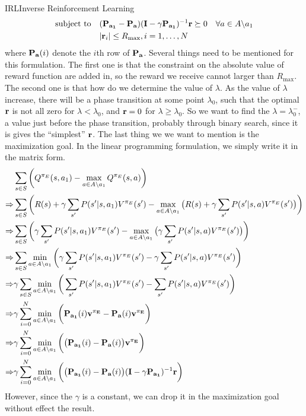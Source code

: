 \documentclass[9pt]{article}
\begin{document}
\begin{topic}{IRL}{Inverse Reinforcement Learning}
\[\begin{split}
\text{subject to} & \quad (\mathbf{P_{a_1}} - \mathbf{P_{a}})(\mathbf{I} - \gamma\mathbf{P_{a_1}})^{-1}\mathbf{r}  \succeq 0 \quad \forall a \in A \backslash a_1\\
& \quad |\mathbf{r}_i| \le R_{\text{max}}, i = 1, \ldots, N
\end{split}
\]
where $\mathbf{P_{a}}(i)$ denote the $i$th row of $\mathbf{P_{a}}$. Several things need to be mentioned for this formulation. The first one is that  the constraint on the absolute value of reward function are added in, so the reward we receive cannot larger than $R_{\text{max}}$. The second one is that how do we determine the value of $\lambda$. As the value of $\lambda$ increase, there will be a phase transition at some point $\lambda_0$, such that the optimal $\mathbf{r}$ is not all zero for $\lambda < \lambda_0$, and $\mathbf{r} = 0$ for $\lambda \ge \lambda_0$. So we want to find the $\lambda = \lambda_0^{-}$, a value just before the phase transition, probably through binary search, since it is gives the ``simplest'' $\mathbf{r}$. The last thing we we want to mention is the maximization goal. In the linear programming formulation, we simply write it in the matrix form.
\[
\begin{split}
	& \sum_{s\in S} \bigg(Q^{\pi_E}(s, a_1) - \max_{a\in A\backslash a_1}Q^{\pi_E}(s,a)\bigg)\\
\Rightarrow & \sum_{s\in S} \bigg(R(s) + \gamma \sum_{s'}P(s'|s,a_1)V^{\pi_E}(s') - \max_{a\in A\backslash a_1} \big(R(s) + \gamma \sum_{s'}P(s'|s,a)V^{\pi_E}(s')\big)\bigg)\\
\Rightarrow & \sum_{s\in S} \bigg(\gamma \sum_{s'}P(s'|s,a_1)V^{\pi_E}(s') - \max_{a\in A\backslash a_1} \big(\gamma \sum_{s'}P(s'|s,a)V^{\pi_E}(s')\big)\bigg)\\
\Rightarrow & \sum_{s\in S} \min_{a\in A\backslash a_1} \bigg(\gamma \sum_{s'}P(s'|s,a_1)V^{\pi_E}(s') -  \gamma \sum_{s'}P(s'|s,a)V^{\pi_E}(s')\bigg)\\ 
\Rightarrow & \gamma \sum_{s\in S} \min_{a\in A\backslash a_1} \bigg(\sum_{s'}P(s'|s,a_1)V^{\pi_E}(s') -  \sum_{s'}P(s'|s,a)V^{\pi_E}(s')\bigg)\\ 
\Rightarrow & \gamma \sum_{i=0}^{N} \min_{a\in A\backslash a_1} \bigg(\mathbf{P_{a_1}}(i)  \mathbf{v^{\pi_E}} -  \mathbf{P_a}(i)  \mathbf{v^{\pi_E}}\bigg)\\ 
\Rightarrow & \gamma \sum_{i=0}^{N} \min_{a\in A\backslash a_1} \bigg(\big(\mathbf{P_{a_1}}(i)  -  \mathbf{P_a}(i)\big) \mathbf{v^{\pi_E}}\bigg)\\ 
\Rightarrow & \gamma \sum_{i=0}^{N} \min_{a\in A\backslash a_1} \bigg(\big(\mathbf{P_{a_1}}(i)  -  \mathbf{P_a}(i)\big) (\mathbf{I} - \gamma\mathbf{P_{a_1}})^{-1} \mathbf{r}\bigg)\\
\end{split}
\]
However, since the $\gamma$ is a constant, we can drop it in the maximization goal without effect the result.

\end{topic}
\end{document}
